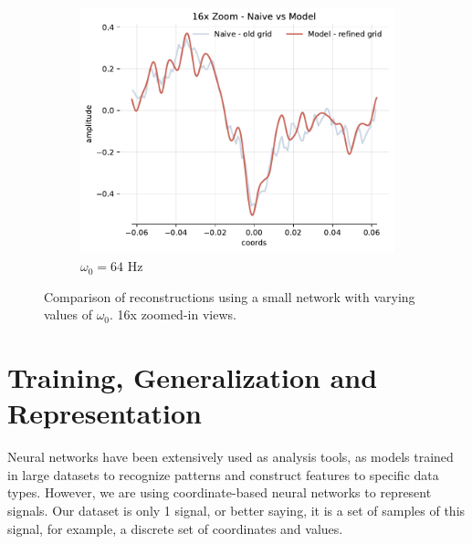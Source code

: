 \begin{figure}[h]
\begin{subfigure}[b]{0.32\textwidth}
        \centering
        \includegraphics[width=\textwidth]{img/ch3/16x_zoom-1hl-16hf-64hz.pdf}
        \caption{$\omega_0=64$ Hz}
    \end{subfigure}
    \caption{Comparison of reconstructions using a small network with varying values of $\omega_0$. 16x zoomed-in views.}
    \label{f:capacity-filter-16hf-increasing-omega}
\end{figure}

\section{Training, Generalization and Representation}
\label{sec:generalization}


Neural networks have been extensively used as analysis tools, as models trained in large datasets to recognize patterns and construct features to specific data types. However, we are using coordinate-based neural networks to represent signals. Our dataset is only 1 signal, or better saying, it is a set of samples of this signal, for example, a discrete set of coordinates and values. 

